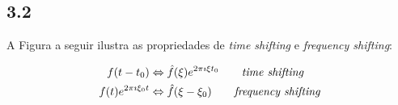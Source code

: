 
\subsection*{3.2}
%

A Figura a seguir ilustra as propriedades de \textit{time shifting} e \textit{frequency shifting}:

\begin{align*}
f(t - t_{0}) &\Leftrightarrow \hat{f}(\xi)e^{2 \pi \imath \xi t_{0}} \tag*{\textit{time shifting}} \\
f(t)e^{2 \pi \imath \xi_{0} t} &\Leftrightarrow \hat{f}(\xi - \xi_{0})  \tag*{\textit{frequency shifting}} 
\end{align*}

\begin{figure}[h!]
	\vspace{2mm}	%
	\begin{center}
	\end{center}
	\vspace{-2mm}	%
	\label{ex1_fig1}
\end{figure}


